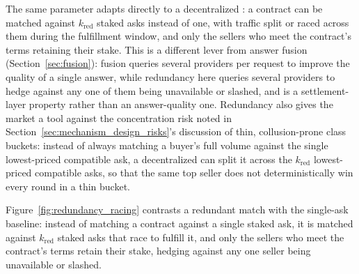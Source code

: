The same parameter adapts directly to a decentralized \NoesisMarket: a
contract can be matched against $k_{\text{red}}$ staked asks instead of
one, with traffic split or raced across them during the fulfillment
window, and only the sellers who meet the contract's terms retaining their
stake. This is a different lever from answer fusion
(Section~\ref{sec:fusion}): fusion queries several providers per request
to improve the quality of a single answer, while redundancy here queries
several providers to hedge against any one of them being unavailable or
slashed, and is a settlement-layer property rather than an answer-quality
one. Redundancy also gives the market a tool against the concentration
risk noted in Section~\ref{sec:mechanism_design_risks}'s discussion of
thin, collusion-prone class buckets: instead of always matching a buyer's
full volume against the single lowest-priced compatible ask, a
decentralized \NoesisMarket{} can split it across the $k_{\text{red}}$
lowest-priced compatible asks, so that the same top seller does not
deterministically win every round in a thin bucket.

Figure~\ref{fig:redundancy_racing} contrasts a redundant match with the
single-ask baseline: instead of matching a contract against a single
staked ask, it is matched against $k_{\text{red}}$ staked asks that race
to fulfill it, and only the sellers who meet the contract's terms retain
their stake, hedging against any one seller being unavailable or slashed.

